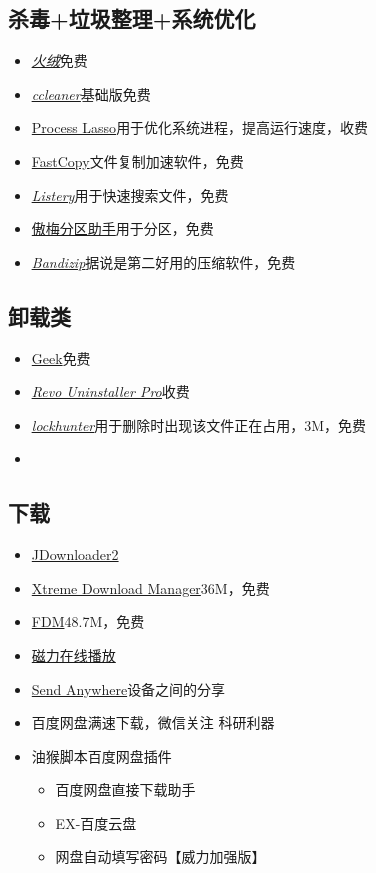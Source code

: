 \documentclass[UTF8]{ctexbook}
\begin{document}
\subsection{杀毒+垃圾整理+系统优化}
\begin{itemize}
	\item \underline{\textit{\href{https://www.huorong.cn}{火绒}}}\quad 免费
	\item \underline{\textit{\href{http://ccleaner.soft88.com}{ccleaner}}}\quad 基础版免费
	\item \href{https://bitsum.com}{Process Lasso}\quad 用于优化系统进程，提高运行速度，收费
	\item \href{https://fastcopy.jp/en/}{FastCopy}\quad 文件复制加速软件，免费
	\item \underline{\textit{\href{https://www.listary.com}{Listery}}}\quad 用于快速搜索文件，免费
	\item \href{http://www.disktool.cn/download.html}{傲梅分区助手}\quad 用于分区，免费
	\item \underline{\textit{\href{http://www.bandisoft.com}{Bandizip}}}\quad 据说是第二好用的压缩软件，免费
\end{itemize}

\subsection{卸载类}
\begin{itemize}
	\item \href{https://geekuninstaller.com}{Geek}\quad 免费
	\item \underline{\textit{\href{https://www.revouninstaller.com/}{Revo Uninstaller Pro}}}\quad 收费
	\item \underline{\textit{\href{https://lockhunter.com}{lockhunter}}}\quad 用于删除时出现该文件正在占用，3M，免费
	\item
\end{itemize}

\subsection{下载}
\begin{itemize}
	\item \href{http://jdownloader.org/jdownloader2}{JDownloader2}
	\item \href{http://xdman.sourceforge.net}{Xtreme Download Manager}\quad 36M，免费
	\item \href{https://www.freedownloadmanager.org/}{FDM}\quad 48.7M，免费
	\item \href{https://webtorrent.io}{磁力在线播放}
	\item \href{https://send-anywhere.com}{Send Anywhere}\quad 设备之间的分享
	\item 百度网盘满速下载，微信关注 科研利器
	\item 油猴脚本百度网盘插件
	\begin{itemize}
		\item 百度网盘直接下载助手
		\item EX-百度云盘
		\item 网盘自动填写密码【威力加强版】
	\end{itemize}
\end{itemize}
\end{document}

